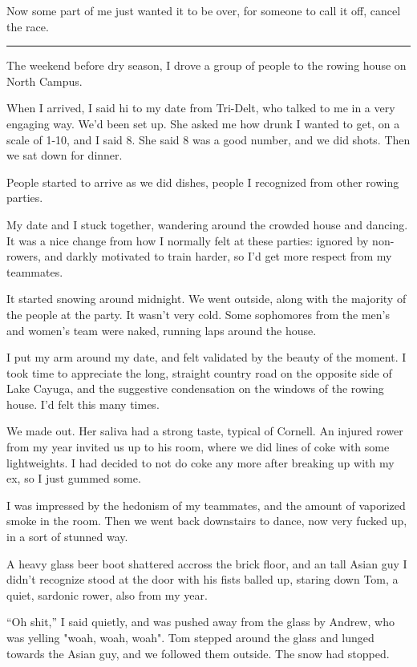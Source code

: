 Now some part of me just wanted it to be over, for someone to call it off,
cancel the race.

\plainfancybreak{12pt}{2}{* * *}

The weekend before dry season, I drove a group of people to the rowing house on
North Campus.

When I arrived, I said hi to my date from Tri-Delt, who talked to me in a very
engaging way.  We'd been set up.  She asked me how drunk I wanted to get, on a
scale of 1-10, and I said 8.  She said 8 was a good number, and we did shots.
Then we sat down for dinner.

People started to arrive as we did dishes, people I recognized from other rowing
parties.  

My date and I stuck together, wandering around the crowded house and dancing. It
was a nice change from how I normally felt at these parties: ignored by
non-rowers, and darkly motivated to train harder, so I'd get more respect from
my teammates.

It started snowing around midnight.  We went outside, along with the majority of
the people at the party.  It wasn't very cold.  Some sophomores from the men's
and women's team were naked, running laps around the house.

I put my arm around my date, and felt validated by the beauty of the moment.   I
took time to appreciate the long, straight country road on the opposite side of
Lake Cayuga, and the suggestive condensation on the windows of the rowing house.
I'd felt this many times.

We made out. Her saliva had a strong taste, typical of Cornell.  An injured
rower from my year invited us up to his room, where we did lines of coke with
some lightweights.  I had decided to not do coke any more after breaking up with
my ex, so I just gummed some.  

I was impressed by the hedonism of my teammates, and the amount of vaporized
smoke in the room.  Then we went back downstairs to dance, now very fucked up,
in a sort of stunned way.  

A heavy glass beer boot shattered accross the brick floor, and an tall Asian guy
I didn't recognize stood at the door with his fists balled up, staring down Tom,
a quiet, sardonic rower, also from my year.  

``Oh shit,'' I said quietly, and was pushed away from the glass by Andrew, who
was yelling "woah, woah, woah".  Tom stepped around the glass and lunged towards
the Asian guy, and we followed them outside.  The snow had stopped.

